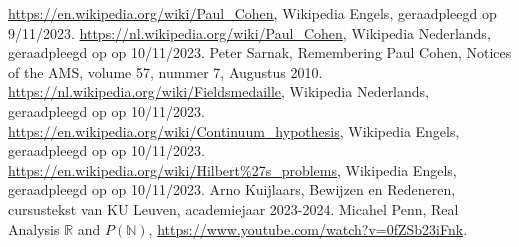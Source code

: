 \documentclass[hidelinks,11pt,a4paper]{article}
\begin{document}
\begin{thebibliography}{9}
 \url{https://en.wikipedia.org/wiki/Paul_Cohen}, Wikipedia Engels, geraadpleegd op 9/11/2023. 
 \url{https://nl.wikipedia.org/wiki/Paul_Cohen}, Wikipedia Nederlands, geraadpleegd op op 10/11/2023. 
 Peter Sarnak, Remembering Paul Cohen, Notices of the AMS, volume 57, nummer 7, Augustus 2010.
  \url{https://nl.wikipedia.org/wiki/Fieldsmedaille}, Wikipedia Nederlands, geraadpleegd op op 10/11/2023. 
 \url{https://en.wikipedia.org/wiki/Continuum_hypothesis}, Wikipedia Engels, geraadpleegd op op 10/11/2023. 
 \url{https://en.wikipedia.org/wiki/Hilbert%27s_problems}, Wikipedia Engels, geraadpleegd op op 10/11/2023.  
 Arno Kuijlaars, Bewijzen en Redeneren, cursustekst van KU Leuven, academiejaar 2023-2024. 
 Micahel Penn, Real Analysis $\mathbb{R}$ and $P(\mathbb{N})$, \url{https://www.youtube.com/watch?v=0fZSb23iFnk}.  


\end{thebibliography}
\end{document}
